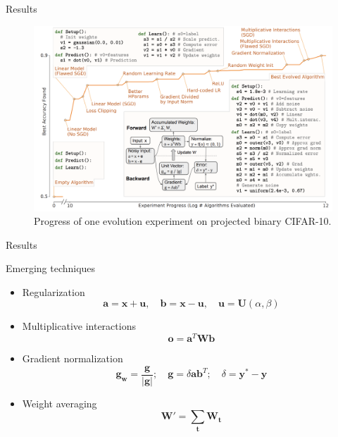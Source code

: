 \documentclass{beamer}
\begin{document}
\begin{frame}{Results}
 
    \begin{figure}
        \centering
        \includegraphics[scale=0.4]{progress.png}
        \caption{Progress of one evolution experiment on projected binary CIFAR-10.}
        \label{fig:prog}
    \end{figure}
    
\end{frame}


\begin{frame}{Results}
 
    \begin{block}{Emerging techniques}
    \begin{itemize}
        \item Regularization
        \[\mathbf{a} = \mathbf{x} + \mathbf{u},\quad \mathbf{b} = \mathbf{x} - \mathbf{u},\quad \mathbf{u} = \mathbf{U}(\alpha, \beta) \]
        \item Multiplicative interactions
        \[\mathbf{o} = \mathbf{a}^T\mathbf{W} \mathbf{b}\]
        \item Gradient normalization
        \[\mathbf{g_w} = \frac{\mathbf{g}}{|\mathbf{g}|}; \quad \mathbf{g} = \delta \mathbf{a} \mathbf{b}^T; \quad \delta = \mathbf{y}^* - \mathbf{y}\]
        \item Weight averaging
        \[\mathbf{W'} = \sum_\mathbf{t} \mathbf{W_t} \]
    \end{itemize}
        
    \end{block}
    
\end{frame}
\end{document}
